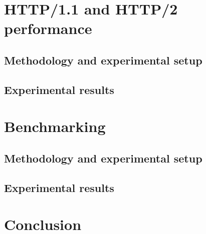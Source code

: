\documentclass[a4paper,10pt]{article}
\begin{document}
\section{HTTP/1.1 and HTTP/2 performance}
\subsection{Methodology and experimental setup}
\subsection{Experimental results}

\section{Benchmarking}
\subsection{Methodology and experimental setup}
\subsection{Experimental results}

\section{Conclusion}
\end{document}
